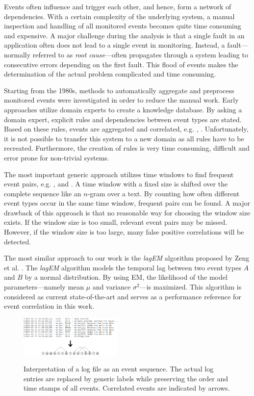 \documentclass[conference]{IEEEtran}
\theoremstyle{examplestyle}
\begin{document}
Events often influence and trigger each other, and hence, form a network of dependencies. With a certain complexity of the underlying system, a manual inspection and handling of all monitored events becomes quite time consuming and expensive. A major challenge during the analysis is that a single fault in an application often does not lead to a single event in monitoring. Instead, a fault---normally referred to as \textit{root cause}---often propagates through a system leading to consecutive errors depending on the first fault. This flood of events makes the determination of the actual problem complicated and time consuming.

Starting from the 1980s, methods to automatically aggregate and preprocess monitored events were investigated in order to reduce the manual work. Early approaches utilize domain experts to create a knowledge database. By asking a domain expert, explicit rules and dependencies between event types are stated. Based on these rules, events are aggregated and correlated, e.g. \cite{Houck1995}, \cite{Kettschau2002}. Unfortunately, it is not possible to transfer this system to a new domain as all rules have to be recreated. Furthermore, the creation of rules is very time consuming, difficult and error prone for non-trivial systems.

The most important generic approach utilizes time windows to find frequent event pairs, e.g. \cite{Jakobson1993}, \cite{Mannila1997} and \cite{Bouandas2007}. A time window with a fixed size is shifted over the complete sequence like an \(n\)-gram over a text. By counting how often different event types occur in the same time window, frequent pairs can be found. A major drawback of this approach is that no reasonable way for choosing the window size exists. If the window size is too small, relevant event pairs may be missed. However, if the window size is too large, many false positive correlations will be detected.


The most similar approach to our work is the \textit{lagEM} algorithm proposed by Zeng et al. \cite{Zeng2015}. The \textit{lagEM} algorithm models the temporal lag between two event types \(A\) and \(B\) by a normal distribution. By using \ac{EM}, the likelihood of the model parameters---namely mean \(\mu\) and variance \(\sigma^2\)---is maximized. This algorithm is considered as current state-of-the-art and serves as a performance reference for event correlation in this work.

\begin{figure}[!tb]
	\centering
	{
	\includegraphics[width=0.45\textwidth]{images/overview.png}}
	\caption{Interpretation of a log file as an event sequence. The actual log entries are replaced by generic labels while preserving the order and time stamps of all events. Correlated events are indicated by arrows.}
	\label{fig:logToSequence}
\end{figure}
\end{document}
